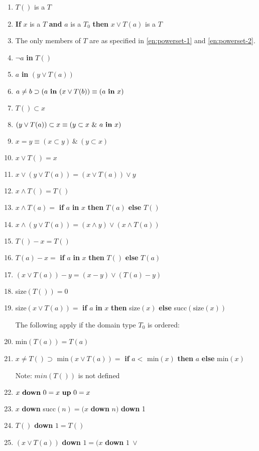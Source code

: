 \begin{enumerate}[wide, nosep, label=(\arabic*)]
	\item \label{en:powerset-1}
	$T()$ is a $T$
	\item \label{en:powerset-2}
	\textbf{If} $x$ is a $T$ \textbf{and} $a$ is a $T_0$ \textbf{then} $x \vee T(a)$ is a $T$
	\item The only members of $T$ are as specified in \ref{en:powerset-1} and \ref{en:powerset-2}.
	\item $\neg a$ \textbf{in} $T()$
	\item $a$ \textbf{in} $(y \lor T(a))$
	\item $a \neq b \supset (a \text{ \textbf{in} } (x \lor T(b)) \equiv (a \text{ \textbf{in} } x)$
	\item $T() \subset x$
	\item $(y \lor T(a)) \subset x \equiv (y \subset x\ \&\ a \text{ \textbf{in} } x)$
	\item $x = y \equiv (x \subset y)\ \&\ (y \subset x)$
	\setcounter{enumi}{9}
	\item $x \lor T() = x$
	\item $x \lor (y \lor T(a)) = (x \lor T(a)) \lor y$
	\item $x \land T() = T()$
	\item $x \land T(a) =$ \textbf{if} $a$ \textbf{in} $x$ \textbf{then} $T(a)$ \textbf{else} $T()$
	\item $x \land (y \lor T(a)) = (x \land y) \lor (x \land T(a))$
	\item $T() - x = T()$
	\item $T(a) - x =$ \textbf{if} $a$ \textbf{in} $x$ \textbf{then} $T()$ \textbf{else} $T(a)$
	\item $(x \lor T(a)) - y = (x - y) \lor (T(a) - y)$
	\item size$(T()) = 0$
	\item size$(x \lor T(a)) =$ \textbf{if} $a$ \textbf{in} $x$ \textbf{then} size$(x)$ \textbf{else} succ$(\text{size}(x))$

	The following apply if the domain type $T_0$ is ordered:

	\item min$(T(a)) = T(a)$
	\item $x \neq T() \supset$ min$(x \lor T(a)) =$ \textbf{if} $a <$ min$(x)$ \textbf{then} $a$ \textbf{else} min$(x)$

	\noindent
	Note: $min(T())$ is not defined

	\item $x \text{ \textbf{down} } 0 = x \text{ \textbf{up} } 0 = x$
	\item $x$ \textbf{down} succ$(n) = (x$ \textbf{down} $n)$ \textbf{down} 1
	\item $T()$ \textbf{down} $1 = T()$
	\item $(x \lor T(a))$ \textbf{down} $1 = (x$ \textbf{down} $1\ \lor$
	

\end{enumerate}
